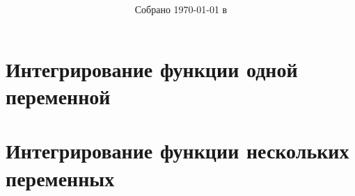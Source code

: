 \documentclass[a4paper]{article}
\title{\huge \textbf{\papertitle}}
\author{\paperauthors}
\date{Собрано {\ddmmyyyydate\today} в \currenttime}
\begin{document}
  
  

  \section{Интегрирование функции одной переменной}
  
  
  
  
  
  
  
  
  
  
  
  
  
  
  
  
  
  
  
  
  
  
  
  

  \section{Интегрирование функции нескольких переменных}
  
  
  
  
  
  
  
  
  
  
  
  
  
  
  
  
  
  
  
  
  
  
  
\end{document}
